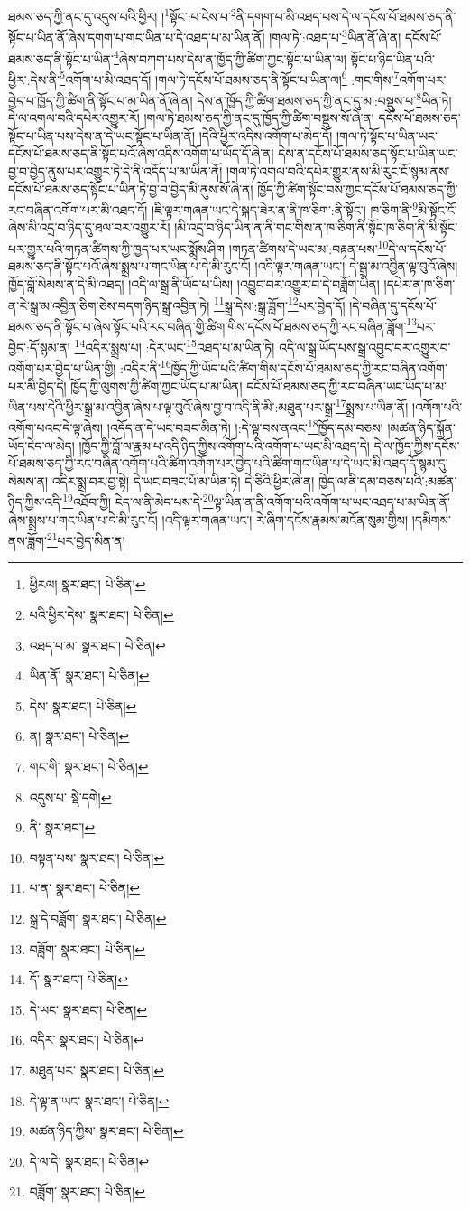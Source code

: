 ཐམས་ཅད་ཀྱི་ནང་དུ་འདུས་པའི་ཕྱིར། །\footnote{ཕྱིརལ།   སྣར་ཐང་།  པེ་ཅིན། }སྟོང་:པ་ངེས་པ་\footnote{པའི་ཕྱིར་དེས་  སྣར་ཐང་།  པེ་ཅིན། }ནི་དགག་པ་མི་འཐད་པས་དེ་ལ་དངོས་པོ་ཐམས་ཅད་ནི་སྟོང་པ་ཡིན་ནོ་ཞེས་དགག་པ་གང་ཡིན་པ་དེ་འཐད་པ་མ་ཡིན་ནོ། །གལ་ཏེ་:འཐད་པ་\footnote{འཐད་པ་མ་  སྣར་ཐང་།  པེ་ཅིན། }ཡིན་ནོ་ཞེ་ན། དངོས་པོ་ཐམས་ཅད་ནི་སྟོང་པ་ཡིན་\footnote{ཡིན་ནོ་  སྣར་ཐང་།  པེ་ཅིན། }ཞེས་བཀག་པས་དེས་ན་ཁྱོད་ཀྱི་ཚིག་ཀྱང་སྟོང་པ་ཡིན་ལ། སྟོང་པ་ཉིད་ཡིན་པའི་ཕྱིར་:དེས་ནི་\footnote{དེས་  སྣར་ཐང་།  པེ་ཅིན། }འགོག་པ་མི་འཐད་དོ། །གལ་ཏེ་དངོས་པོ་ཐམས་ཅད་ནི་སྟོང་པ་ཡིན་ལ།\footnote{ན།  སྣར་ཐང་།  པེ་ཅིན། } :གང་གིས་\footnote{གང་གི་  སྣར་ཐང་།  པེ་ཅིན། }འགོག་པར་བྱེད་པ་ཁྱོད་ཀྱི་ཚིག་ནི་སྟོང་པ་མ་ཡིན་ནོ་ཞེ་ན། དེས་ན་ཁྱོད་ཀྱི་ཚིག་ཐམས་ཅད་ཀྱི་ནང་དུ་མ་:བསྡུས་པ་\footnote{འདུས་པ་  སྡེ་དགེ། }ཡིན་ཏེ། དེ་ལ་འགལ་བའི་དཔེར་འགྱུར་རོ། །གལ་ཏེ་ཐམས་ཅད་ཀྱི་ནང་དུ་ཁྱོད་ཀྱི་ཚིག་བསྡུས་སོ་ཞེ་ན། དངོས་པོ་ཐམས་ཅད་སྟོང་པ་ཡིན་པས་དེས་ན་དེ་ཡང་སྟོང་པ་ཡིན་ནོ། །དེའི་ཕྱིར་འདིས་འགོག་པ་མེད་དོ། །གལ་ཏེ་སྟོང་པ་ཡིན་ཡང་དངོས་པོ་ཐམས་ཅད་ནི་སྟོང་པའོ་ཞེས་འདིས་འགོག་པ་ཡོད་དོ་ཞེ་ན། དེས་ན་དངོས་པོ་ཐམས་ཅད་སྟོང་པ་ཡིན་ཡང་བྱ་བ་བྱེད་ནུས་པར་འགྱུར་ཏེ་དེ་ནི་འདོད་པ་མ་ཡིན་ནོ། །གལ་ཏེ་འགལ་བའི་དཔེར་གྱུར་ནས་མི་རུང་ངོ་སྙམ་ནས་དངོས་པོ་ཐམས་ཅད་སྟོང་པ་ཡིན་ཏེ་བྱ་བ་བྱེད་མི་ནུས་སོ་ཞེ་ན། ཁྱོད་ཀྱི་ཚིག་སྟོང་བས་ཀྱང་དངོས་པོ་ཐམས་ཅད་ཀྱི་རང་བཞིན་འགོག་པར་མི་འཐད་དོ། །ཇི་ལྟར་གཞན་ཡང་དེ་སྐད་ཟེར་ན་ནི་ཁ་ཅིག་:ནི་སྟོང་། ཁ་ཅིག་ནི་\footnote{ནི་  སྣར་ཐང་། }མི་སྟོང་ངོ་ཞེས་མི་འདྲ་བ་ཉིད་དུ་ཐལ་བར་འགྱུར་རོ། །མི་འདྲ་བ་ཉིད་ཡིན་ན་ནི་གང་གིས་ན་ཁ་ཅིག་ནི་སྟོང་ཁ་ཅིག་ནི་མི་སྟོང་པར་གྱུར་པའི་གཏན་ཚིགས་ཀྱི་ཁྱད་པར་ཡང་སྨྲོས་ཤིག །གཏན་ཚིགས་དེ་ཡང་མ་:བརྟན་པས་\footnote{བསྟན་པས་  སྣར་ཐང་།  པེ་ཅིན། }དེ་ལ་དངོས་པོ་ཐམས་ཅད་ནི་སྟོང་པའོ་ཞེས་སྨྲས་པ་གང་ཡིན་པ་དེ་མི་རུང་ངོ། །འདི་ལྟར་གཞན་ཡང་། དེ་སྒྲ་མ་འབྱིན་ལྟ་བུའོ་ཞེས། ཁྱོད་བློ་སེམས་ན་དེ་མི་འཐད། །འདི་ལ་སྒྲ་ནི་ཡོད་པ་ཡིས། །འབྱུང་བར་འགྱུར་བ་དེ་བཟློག་ཡིན། །དཔེར་ན་ཁ་ཅིག་ན་རེ་སྒྲ་མ་འབྱིན་ཅིག་ཅེས་བདག་ཉིད་སྒྲ་འབྱིན་ཏེ། \footnote{པ་ན་  སྣར་ཐང་།  པེ་ཅིན། }སྒྲ་དེས་:སྒྲ་ཟློག་\footnote{སྒྲ་དེ་བཟློག་  སྣར་ཐང་།  པེ་ཅིན། }པར་བྱེད་དོ། །དེ་བཞིན་དུ་དངོས་པོ་ཐམས་ཅད་ནི་སྟོང་པ་ཞེས་སྟོང་པའི་རང་བཞིན་གྱི་ཚིག་གིས་དངོས་པོ་ཐམས་ཅད་ཀྱི་རང་བཞིན་ཟློག་\footnote{བཟློག་  སྣར་ཐང་།  པེ་ཅིན། }པར་བྱེད་:དོ་སྙམ་ན། \footnote{དོ་  སྣར་ཐང་།  པེ་ཅིན། }འདིར་སྨྲས་པ། :དེར་ཡང་\footnote{དེ་ཡང་  སྣར་ཐང་།  པེ་ཅིན། }འཐད་པ་མ་ཡིན་ཏེ། འདི་ལ་སྒྲ་ཡོད་པས་སྒྲ་འབྱུང་བར་འགྱུར་བ་འགོག་པར་བྱེད་པ་ཡིན་གྱི། :འདིར་ནི་\footnote{འདིར་  སྣར་ཐང་།  པེ་ཅིན། }ཁྱོད་ཀྱི་ཡོད་པའི་ཚིག་གིས་དངོས་པོ་ཐམས་ཅད་ཀྱི་རང་བཞིན་འགོག་པར་མི་བྱེད་དེ། ཁྱོད་ཀྱི་ལུགས་ཀྱི་ཚིག་ཀྱང་ཡོད་པ་མ་ཡིན། དངོས་པོ་ཐམས་ཅད་ཀྱི་རང་བཞིན་ཡང་ཡོད་པ་མ་ཡིན་པས་དེའི་ཕྱིར་སྒྲ་མ་འབྱིན་ཞེས་པ་ལྟ་བུའོ་ཞེས་བྱ་བ་འདི་ནི་མི་:མཐུན་པར་སྒྲ་\footnote{མཐུན་པར་  སྣར་ཐང་།  པེ་ཅིན། }སྨྲས་པ་ཡིན་ནོ། །འགོག་པའི་འགོག་པའང་དེ་ལྟ་ཞེས། །འདོད་ན་དེ་ཡང་བཟང་མིན་ཏེ། །:དེ་ལྟ་བས་ནའང་\footnote{དེ་ལྟ་ན་ཡང་  སྣར་ཐང་།  པེ་ཅིན། }ཁྱོད་དམ་བཅས། །མཚན་ཉིད་སྐྱོན་ཡོད་ངེད་ལ་མེད། །ཁྱོད་ཀྱི་བློ་ལ་རྣམ་པ་འདི་ཉིད་ཀྱིས་འགོག་པའི་འགོག་པ་ཡང་མི་འཐད་དེ། དེ་ལ་ཁྱོད་ཀྱིས་དངོས་པོ་ཐམས་ཅད་ཀྱི་རང་བཞིན་འགོག་པའི་ཚིག་འགོག་པར་བྱེད་པའི་ཚིག་གང་ཡིན་པ་དེ་ཡང་མི་འཐད་དོ་སྙམ་དུ་སེམས་ན། འདིར་སྨྲ་བར་བྱ་སྟེ། དེ་ཡང་བཟང་པོ་མ་ཡིན་ཏེ། དེ་ཅིའི་ཕྱིར་ཞེ་ན། ཁྱེད་ལ་ནི་དམ་བཅས་པའི་:མཚན་ཉིད་ཀྱིས་འདི་\footnote{མཚན་ཉིད་ཀྱིས་  སྣར་ཐང་།  པེ་ཅིན། }འཐོབ་ཀྱི། ངེད་ལ་ནི་མེད་པས་དེ་\footnote{དེ་ལ་དེ་  སྣར་ཐང་།  པེ་ཅིན། }ལྟ་ཡིན་ན་ནི་འགོག་པའི་འགོག་པ་ཡང་འཐད་པ་མ་ཡིན་ནོ་ཞེས་སྨྲས་པ་གང་ཡིན་པ་དེ་མི་རུང་ངོ། །འདི་ལྟར་གཞན་ཡང་། རེ་ཞིག་དངོས་རྣམས་མངོན་སུམ་གྱིས། །དམིགས་ནས་ཟློག་\footnote{བཟློག་  སྣར་ཐང་།  པེ་ཅིན། }པར་བྱེད་མིན་ན། 
